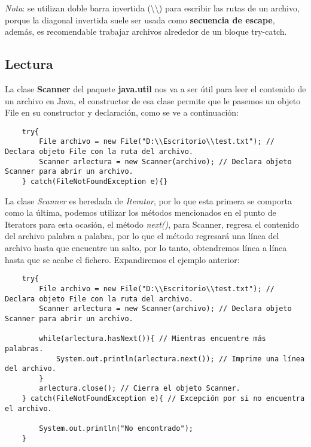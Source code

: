 \textit{Nota}: se utilizan doble barra invertida (\textbackslash\textbackslash) para escribir las rutas de un archivo, porque la diagonal invertida suele ser usada como \textbf{secuencia de escape}, además, es recomendable trabajar archivos alrededor de un bloque try-catch.


\subsection{Lectura}

La clase \textbf{Scanner} del paquete \textbf{java.util} nos va a ser útil para leer el contenido de un archivo en Java, el constructor de esa clase permite que le pasemos un objeto File en su constructor y declaración, como se ve a continuación:
\begin{lstlisting}
    try{
        File archivo = new File("D:\\Escritorio\\test.txt"); // Declara objeto File con la ruta del archivo.
        Scanner arlectura = new Scanner(archivo); // Declara objeto Scanner para abrir un archivo.
    } catch(FileNotFoundException e){}
\end{lstlisting}

La clase \textit{Scanner} es heredada de \textit{Iterator}, por lo que esta primera se comporta como la última, podemos utilizar los métodos mencionados en el punto de Iterators para esta ocasión, el método \textit{next()}, para Scanner, regresa el contenido del archivo palabra a palabra, por lo que el método regresará una línea del archivo hasta que encuentre un salto, por lo tanto, obtendremos línea a línea hasta que se acabe el fichero. Expandiremos el ejemplo anterior:
\begin{lstlisting}
    try{
        File archivo = new File("D:\\Escritorio\\test.txt"); // Declara objeto File con la ruta del archivo.
        Scanner arlectura = new Scanner(archivo); // Declara objeto Scanner para abrir un archivo.
        
        while(arlectura.hasNext()){ // Mientras encuentre más palabras.
            System.out.println(arlectura.next()); // Imprime una línea del archivo.
        }
        arlectura.close(); // Cierra el objeto Scanner.
    } catch(FileNotFoundException e){ // Excepción por si no encuentra el archivo.
    
        System.out.println("No encontrado");
    }
\end{lstlisting}


